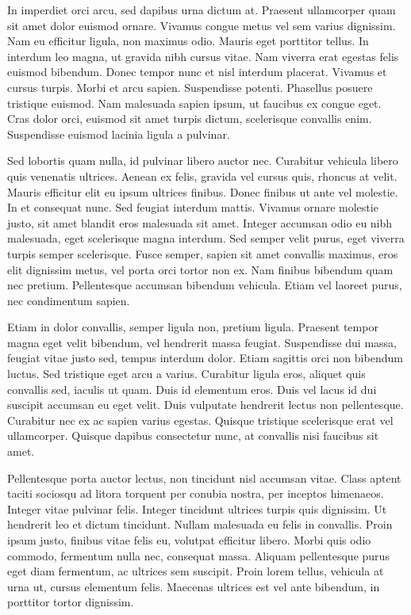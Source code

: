 \documentclass[12pt]{article}
\begin{document}
In imperdiet orci arcu, sed dapibus urna dictum at. Praesent ullamcorper quam sit amet dolor euismod ornare. Vivamus congue metus vel sem varius dignissim. Nam eu efficitur ligula, non maximus odio. Mauris eget porttitor tellus. In interdum leo magna, ut gravida nibh cursus vitae. Nam viverra erat egestas felis euismod bibendum. Donec tempor nunc et nisl interdum placerat. Vivamus et cursus turpis. Morbi et arcu sapien. Suspendisse potenti. Phasellus posuere tristique euismod. Nam malesuada sapien ipsum, ut faucibus ex congue eget. Cras dolor orci, euismod sit amet turpis dictum, scelerisque convallis enim. Suspendisse euismod lacinia ligula a pulvinar.

Sed lobortis quam nulla, id pulvinar libero auctor nec. Curabitur vehicula libero quis venenatis ultrices. Aenean ex felis, gravida vel cursus quis, rhoncus at velit. Mauris efficitur elit eu ipsum ultrices finibus. Donec finibus ut ante vel molestie. In et consequat nunc. Sed feugiat interdum mattis. Vivamus ornare molestie justo, sit amet blandit eros malesuada sit amet. Integer accumsan odio eu nibh malesuada, eget scelerisque magna interdum. Sed semper velit purus, eget viverra turpis semper scelerisque. Fusce semper, sapien sit amet convallis maximus, eros elit dignissim metus, vel porta orci tortor non ex. Nam finibus bibendum quam nec pretium. Pellentesque accumsan bibendum vehicula. Etiam vel laoreet purus, nec condimentum sapien.

Etiam in dolor convallis, semper ligula non, pretium ligula. Praesent tempor magna eget velit bibendum, vel hendrerit massa feugiat. Suspendisse dui massa, feugiat vitae justo sed, tempus interdum dolor. Etiam sagittis orci non bibendum luctus. Sed tristique eget arcu a varius. Curabitur ligula eros, aliquet quis convallis sed, iaculis ut quam. Duis id elementum eros. Duis vel lacus id dui suscipit accumsan eu eget velit. Duis vulputate hendrerit lectus non pellentesque. Curabitur nec ex ac sapien varius egestas. Quisque tristique scelerisque erat vel ullamcorper. Quisque dapibus consectetur nunc, at convallis nisi faucibus sit amet.

Pellentesque porta auctor lectus, non tincidunt nisl accumsan vitae. Class aptent taciti sociosqu ad litora torquent per conubia nostra, per inceptos himenaeos. Integer vitae pulvinar felis. Integer tincidunt ultrices turpis quis dignissim. Ut hendrerit leo et dictum tincidunt. Nullam malesuada eu felis in convallis. Proin ipsum justo, finibus vitae felis eu, volutpat efficitur libero. Morbi quis odio commodo, fermentum nulla nec, consequat massa. Aliquam pellentesque purus eget diam fermentum, ac ultrices sem suscipit. Proin lorem tellus, vehicula at urna ut, cursus elementum felis. Maecenas ultrices est vel ante bibendum, in porttitor tortor dignissim.
\end{document}
